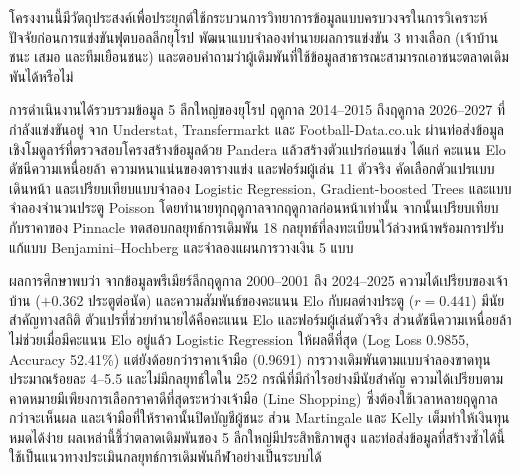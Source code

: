 โครงงานนี้มีวัตถุประสงค์เพื่อประยุกต์ใช้กระบวนการวิทยาการข้อมูลแบบครบวงจรในการวิเคราะห์ปัจจัยก่อนการแข่งขันฟุตบอลลีกยุโรป พัฒนาแบบจำลองทำนายผลการแข่งขัน 3 ทางเลือก (เจ้าบ้านชนะ เสมอ และทีมเยือนชนะ) และตอบคำถามว่าผู้เดิมพันที่ใช้ข้อมูลสาธารณะสามารถเอาชนะตลาดเดิมพันได้หรือไม่

การดำเนินงานได้รวบรวมข้อมูล 5 ลีกใหญ่ของยุโรป ฤดูกาล 2014--2015 ถึงฤดูกาล 2026--2027 ที่กำลังแข่งขันอยู่ จาก Understat, Transfermarkt และ Football-Data.co.uk ผ่านท่อส่งข้อมูลเชิงโมดูลาร์ที่ตรวจสอบโครงสร้างข้อมูลด้วย Pandera แล้วสร้างตัวแปรก่อนแข่ง ได้แก่ คะแนน Elo ดัชนีความเหนื่อยล้า ความหนาแน่นของตารางแข่ง และฟอร์มผู้เล่น 11 ตัวจริง คัดเลือกตัวแปรแบบเดินหน้า และเปรียบเทียบแบบจำลอง Logistic Regression, Gradient-boosted Trees และแบบจำลองจำนวนประตู Poisson โดยทำนายทุกฤดูกาลจากฤดูกาลก่อนหน้าเท่านั้น จากนั้นเปรียบเทียบกับราคาของ Pinnacle ทดสอบกลยุทธ์การเดิมพัน 18 กลยุทธ์ที่ลงทะเบียนไว้ล่วงหน้าพร้อมการปรับแก้แบบ Benjamini--Hochberg และจำลองแผนการวางเงิน 5 แบบ

ผลการศึกษาพบว่า จากข้อมูลพรีเมียร์ลีกฤดูกาล 2000--2001 ถึง 2024--2025 ความได้เปรียบของเจ้าบ้าน ($+0.362$ ประตูต่อนัด) และความสัมพันธ์ของคะแนน Elo กับผลต่างประตู ($r = 0.441$) มีนัยสำคัญทางสถิติ ตัวแปรที่ช่วยทำนายได้คือคะแนน Elo และฟอร์มผู้เล่นตัวจริง ส่วนดัชนีความเหนื่อยล้าไม่ช่วยเมื่อมีคะแนน Elo อยู่แล้ว Logistic Regression ให้ผลดีที่สุด (Log Loss 0.9855, Accuracy 52.41\%) แต่ยังด้อยกว่าราคาเจ้ามือ (0.9691) การวางเดิมพันตามแบบจำลองขาดทุนประมาณร้อยละ 4--5.5 และไม่มีกลยุทธ์ใดใน 252 กรณีที่มีกำไรอย่างมีนัยสำคัญ ความได้เปรียบตามคาดหมายมีเพียงการเลือกราคาดีที่สุดระหว่างเจ้ามือ (Line Shopping) ซึ่งต้องใช้เวลาหลายฤดูกาลกว่าจะเห็นผล และเจ้ามือที่ให้ราคานั้นปิดบัญชีผู้ชนะ ส่วน Martingale และ Kelly เต็มทำให้เงินทุนหมดได้ง่าย ผลเหล่านี้ชี้ว่าตลาดเดิมพันของ 5 ลีกใหญ่มีประสิทธิภาพสูง และท่อส่งข้อมูลที่สร้างซ้ำได้นี้ใช้เป็นแนวทางประเมินกลยุทธ์การเดิมพันกีฬาอย่างเป็นระบบได้
